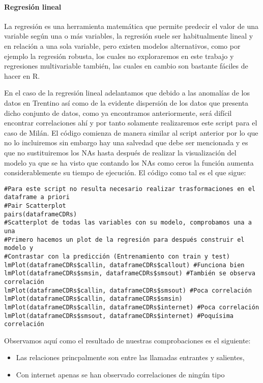 \documentclass[11pt, a4paper]{article} %
\begin{document}
\paragraph{Regresión lineal}
La regresión es una herramienta matemática que permite predecir el valor de una variable según una o más variables, la regresión suele ser habitualmente lineal y en relación a una sola variable, pero existen modelos alternativos, como por ejemplo la regresión robusta, los cuales no exploraremos en este trabajo y regresiones multivariable también, las cuales en cambio son bastante fáciles de hacer en R.


En el caso de la regresión lineal adelantamos que debido a las anomalías de los datos en Trentino así como de la evidente dispersión de los datos que presenta dicho conjunto de datos, como ya encontramos anteriormente, será difícil encontrar correlaciones ahí y por tanto solamente realizaremos este script para el caso de Milán. El código comienza de manera similar al script anterior por lo que no lo incluiremos sin embargo hay una salvedad que debe ser mencionada y es que no sustituiremos los NAs hasta después de realizar la visualización del modelo ya que se ha visto que contando los NAs como ceros la función aumenta considerablemente su tiempo de ejecución. El código como tal es el que sigue: 
\begin{lstlisting}
#Para este script no resulta necesario realizar trasformaciones en el dataframe a priori
#Pair Scatterplot
pairs(dataframeCDRs)
#Scatterplot de todas las variables con su modelo, comprobamos una a una
#Primero hacemos un plot de la regresión para después construir el modelo y
#Contrastar con la predicción (Entrenamiento con train y test)
lmPlot(dataframeCDRs$callin, dataframeCDRs$callout) #Funciona bien
lmPlot(dataframeCDRs$smsin, dataframeCDRs$smsout) #También se observa correlación
lmPlot(dataframeCDRs$callin, dataframeCDRs$smsout) #Poca correlación
lmPlot(dataframeCDRs$callin, dataframeCDRs$smsin)
lmPlot(dataframeCDRs$callin, dataframeCDRs$internet) #Poca correlación
lmPlot(dataframeCDRs$smsout, dataframeCDRs$internet) #Poquísima correlación
\end{lstlisting}
Observamos aquí como el resultado de nuestras comprobaciones es el siguiente:
\begin{itemize}
\item Las relaciones princpalmente son entre las llamadas entrantes y salientes,
\item Con internet apenas se han observado correlaciones de ningún tipo
\end{itemize}
\end{document}
